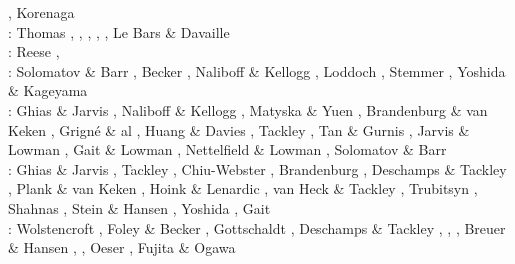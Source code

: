 \begin{scriptsize}
                   \cite{ogaw03,ogaw03b},
                  Korenaga \cite{kore03} \\
\twothousandfour: Thomas \etal \cite{thkl04}, \cite{vavv04b}
                  \cite{xita04b}\cite{xita04},
                  \cite{nata04b}\cite{vayr04},
                  \cite{brws04}\cite{stsh04},
                  \cite{scbh04}, Le Bars \& Davaille \cite{leda04,leda04b} \\
\twothousandfive: Reese \etal \cite{resb05}, \cite{taxn05}
                  \cite{bupc05}\cite{grlt05}
                  \cite{lemj05}\cite{kogk05}
                  \cite{mczh05b}\cite{vary05}
                  \cite{nata05}\cite{nabu05}
                  \cite{chob05}\cite{phbu05}
                  \cite{hosh05}\\
\twothousandsix: Solomatov \& Barr \cite{soba06}, Becker \cite{beck06}, Naliboff \& Kellogg \cite{nake06},
                 Loddoch \etal \cite{losh06}, Stemmer \etal \cite{sthh06}, Yoshida \& Kageyama \cite{yoka06}\\
\twothousandseven: Ghias \& Jarvis \cite{ghja07}, Naliboff \& Kellogg \cite{nake07}, 
                   Matyska \& Yuen \cite{mayu07}, Brandenburg \& van Keken \cite{brva07a,brva07b},
                   Grign\'e \& al \cite{grlt07,grlt07b}, Huang \& Davies \cite{huda07},
                   Tackley \etal \cite{tanh07}, Tan \& Gurnis \cite{tagu07}, 
                   Jarvis \& Lowman \cite{jalo07}, Gait \& Lowman \cite{galo07,galo07b}, 
                   Nettelfield \& Lowman \cite{nelo07}, Solomatov \& Barr \cite{soba07}\\
\twothousandeight: Ghias \& Jarvis \cite{ghja08}, Tackley \cite{tack08,tack08b},
                   Chiu-Webster \etal \cite{chhl08}, Brandenburg \etal \cite{brhv08},
                   Deschamps \& Tackley \cite{deta08}, Plank \& van Keken \cite{plva08},
                   Hoink \& Lenardic \cite{hole08}, van Heck \& Tackley \cite{vata08},
                   Trubitsyn \etal \cite{trkr08}, Shahnas \etal \cite{shlj08},
                   Stein \& Hansen \cite{stha08}, Yoshida \cite{yosh08}, Gait \etal \cite{galg08}\\
\twothousandnine: Wolstencroft \etal \cite{wodd09}, Foley \& Becker \cite{fobe09},
                  Gottschaldt \etal \cite{gows09}, Deschamps \& Tackley \cite{deta09},
                  \cite{onlj09}\cite{wazh09},
                  \cite{vavv09}, Breuer \& Hansen \cite{brha09},
                  \cite{scbs09b}, Oeser \etal \cite{oebm09},
                  Fujita \& Ogawa \cite{fuog09}\\

\end{scriptsize}
